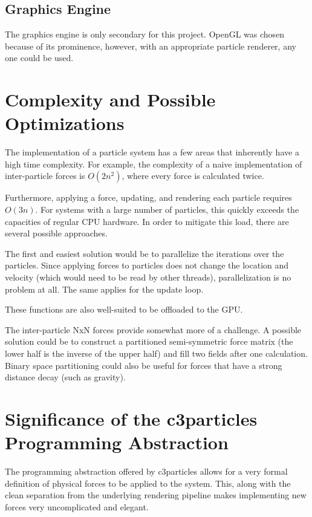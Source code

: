 \documentclass[runningheads,a4paper]{llncs}
\begin{document}

\subsection{Graphics Engine}
The graphics engine is only secondary for this project. OpenGL\cite{opengl} was chosen because of its prominence, however, with an appropriate particle renderer, any one could be used.

\section{Complexity and Possible Optimizations}
The implementation of a particle system has a few areas that inherently have a high time complexity. For example, the complexity of a naive implementation of inter-particle forces is $O(2n^2)$, where every force is calculated twice.

Furthermore, applying a force, updating, and rendering each particle requires $O(3n)$. For systems with a large number of particles, this quickly exceeds the capacities of regular CPU hardware. In order to mitigate this load, there are several possible approaches.

The first and easiest solution would be to parallelize the iterations over the particles. Since applying forces to particles does not change the location and velocity (which would need to be read by other threads), parallelization is no problem at all. The same applies for the update loop.

These functions are also well-suited to be offloaded to the GPU.

The inter-particle NxN forces provide somewhat more of a challenge. A possible solution could be to construct a partitioned semi-symmetric force matrix (the lower half is the inverse of the upper half) and fill two fields after one calculation. Binary space partitioning could also be useful for forces that have a strong distance decay (such as gravity).


\section{Significance of the c3particles Programming Abstraction}

The programming abstraction offered by c3particles allows for a very formal definition of physical forces to be applied to the system. This, along with the clean separation from the underlying rendering pipeline makes implementing new forces very uncomplicated and elegant. 





\end{document}
